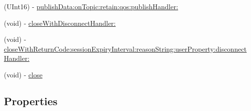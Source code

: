 \begin{DoxyCompactItemize}
\item 
(U\+Int16) -\/ \hyperlink{interface_m_q_t_t_session_a7cea798eb2e74c5885fa60dee04539f0}{publish\+Data\+:on\+Topic\+:retain\+:qos\+:publish\+Handler\+:}
\item 
(void) -\/ \hyperlink{interface_m_q_t_t_session_a5a617d3cee077dd60f48a340d4b34d99}{close\+With\+Disconnect\+Handler\+:}
\item 
(void) -\/ \hyperlink{interface_m_q_t_t_session_add8e169ab335825e0bb9879c7cbce54b}{close\+With\+Return\+Code\+:session\+Expiry\+Interval\+:reason\+String\+:user\+Property\+:disconnect\+Handler\+:}
\item 
(void) -\/ \hyperlink{interface_m_q_t_t_session_a6e08af5a1b20daabe6be9b9a0618c440}{close}
\end{DoxyCompactItemize}
\subsection*{Properties}
